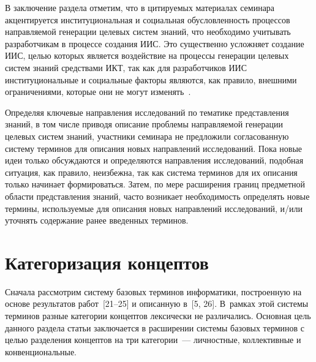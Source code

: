 \begin{multicols}{2}
   В заключение раздела отметим, что в ци\-ти\-ру\-емых материалах семинара акцентируется
институциональная и социальная обусловленность про\-цессов направляемой генерации
целевых систем %
знаний, что необходимо учитывать разработчикам в процессе создания ИИС.
Это существенно усложняет создание ИИС, целью которых является воздействие на
процессы генерации целевых систем знаний средствами ИКТ, так как для разработчиков
ИИС институциональные и социальные факторы являются, как правило, внешними
ограничениями, которые они не могут изменять~\cite{17za}.

   Определяя ключевые направления исследований по тематике представления знаний, в
том числе приводя описание проблемы направляемой генерации целевых систем знаний,
участники семинара не предложили согласованную систему терминов для описания новых
направлений исследований. Пока новые идеи только обсуждаются и определяются
направления исследований, подобная ситуация, как правило, неизбежна, так как система
терминов для их описания только начинает формироваться. Затем, по мере расширения
границ предметной об\-ласти представления знаний, часто возникает необходимость
определять новые термины, используемые для описания новых направлений исследований,
и/или уточнять содержание ранее введенных терминов.

\section{Категоризация концептов}

   Сначала рассмотрим систему базовых терминов информатики, построенную на основе
результатов работ~[21--25] и описанную в~[5, 26]. В~рамках этой
системы терминов разные категории концептов лексически не различались. Основная цель
данного раздела статьи заключается в расширении системы базовых терминов с целью
разделения концептов на три категории~--- личностные, коллективные и конвенциональные.


\end{multicols}
